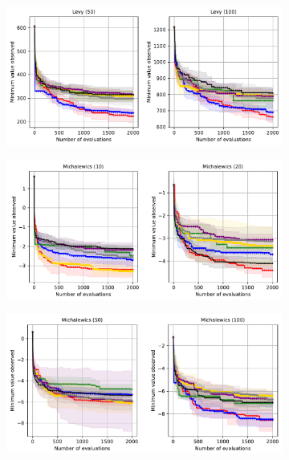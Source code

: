 \begin{figure}[]
    \centering
    \ContinuedFloat
    \begin{subfigure}[b]{\textwidth}
        \centering
        \includegraphics[width=\textwidth]{Figures/Neural-BO/L2.pdf}
    \end{subfigure}
    \begin{subfigure}[b]{\textwidth}
        \centering
        \includegraphics[width=\textwidth]{Figures/Neural-BO/M1.pdf}
    \end{subfigure}
    \begin{subfigure}[b]{\textwidth}
        \centering
        \includegraphics[width=\textwidth]{Figures/Neural-BO/M2.pdf}

\end{subfigure}
\end{figure}
